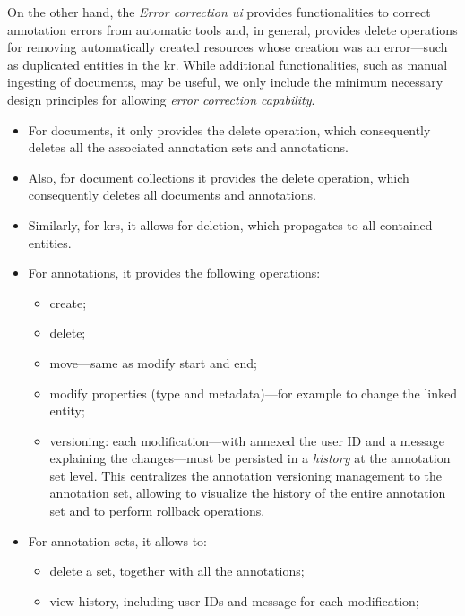 On the other hand, the \emph{Error correction \ac{ui}} provides functionalities to correct annotation errors from automatic tools and, in general, provides delete operations for removing automatically created resources whose creation was an error---such as duplicated entities in the \ac{kr}. While additional functionalities, such as manual ingesting of documents, may be useful, we only include the minimum necessary design principles for allowing \emph{error correction capability}.
\begin{itemize}
  \item For documents, it only provides the delete operation, which consequently deletes all the associated annotation sets and annotations.
  \item Also, for document collections it provides the delete operation, which consequently deletes all documents and annotations.
  \item Similarly, for \aclp{kr}, it allows for deletion, which propagates to all contained entities.
  \item For annotations, it provides the following operations:
  \begin{itemize}
    \item create;
    \item delete;
    \item move---same as modify start and end;
    \item modify properties (type and metadata)---for example to change the linked entity;
    \item versioning: each modification---with annexed the user ID and a message explaining the changes---must be persisted in a \emph{history} at the annotation set level. This centralizes the annotation versioning management to the annotation set, allowing to visualize the history of the entire annotation set and to perform rollback operations. 
  \end{itemize}
  \item For annotation sets, it allows to:
  \begin{itemize}
    \item delete a set, together with all the annotations;
    \item view history, including user IDs and message for each modification;

\end{itemize}
\end{itemize}
